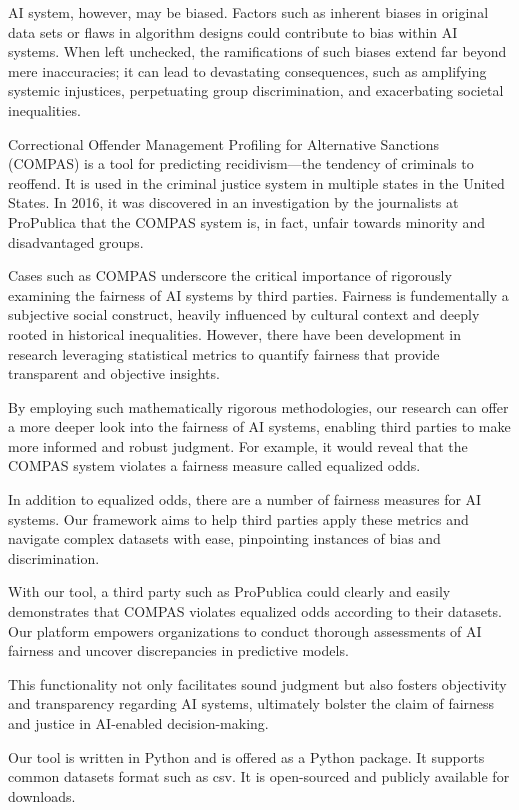 \documentclass[conference]{IEEEtran}
\begin{document}
AI system, however, may be biased. Factors such as inherent biases in original data sets or flaws in algorithm designs could contribute to bias within AI systems. When left unchecked, the ramifications of such biases extend far beyond mere inaccuracies; it can lead to devastating consequences, such as amplifying systemic injustices, perpetuating group discrimination, and exacerbating societal inequalities.

Correctional Offender Management Profiling for Alternative Sanctions (COMPAS) is a tool for predicting recidivism---the tendency of criminals to reoffend. It is used in the criminal justice system in multiple states in the United States. In 2016, it was discovered in an investigation by the journalists at ProPublica that the COMPAS system is, in fact, unfair towards minority and disadvantaged groups.

Cases such as COMPAS underscore the critical importance of rigorously examining the fairness of AI systems by third parties. Fairness is fundementally a subjective social construct, heavily influenced by cultural context and deeply rooted in historical inequalities. However, there have been development in research leveraging statistical metrics to quantify fairness that provide transparent and objective insights.

By employing such mathematically rigorous methodologies, our research can offer a more deeper look into the fairness of AI systems, enabling third parties to make more informed and robust judgment. For example, it would reveal that the COMPAS system violates a fairness measure called equalized odds.

In addition to equalized odds, there are a number of fairness measures for AI systems. Our framework aims to help third parties apply these metrics and navigate complex datasets with ease, pinpointing instances of bias and discrimination.

With our tool, a third party such as ProPublica could clearly and easily demonstrates that COMPAS violates equalized odds according to their datasets. Our platform empowers organizations to conduct thorough assessments of AI fairness and uncover discrepancies in predictive models.

This functionality not only facilitates sound judgment but also fosters objectivity and transparency regarding AI systems, ultimately bolster the claim of fairness and justice in AI-enabled decision-making.

Our tool is written in Python and is offered as a Python package. It supports common datasets format such as csv. It is open-sourced and publicly available for downloads.
\end{document}
